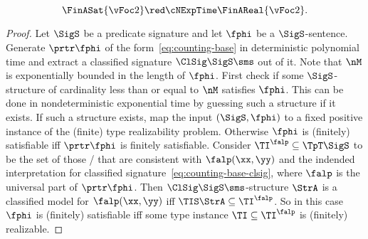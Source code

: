 \begin{remark}
\[
\FinASat{\vFoc2} \red\cNExpTime \FinAReal{\vFoc2}.
\]
\end{remark}
\begin{proof}
Let $\SigS$ be a predicate signature and let $\fphi$ be a $\SigS$-sentence.
Generate $\prtr\fphi$ of the form~\cref{eq:counting-base} in deterministic
polynomial time and extract a classified signature $\ClSig\SigS\sms$ out of it.
Note that $\nM$ is exponentially bounded in the length of $\fphi$.
First check if some $\SigS$-structure of cardinality less than or equal to $\nM$
satisfies $\fphi$. This can be done in nondeterministic exponential time by
guessing such a structure if it exists.
If such a structure exists, map the input $(\SigS,\fphi)$ to a fixed positive
instance of the (finite) type realizability problem.
Otherwise $\fphi$ is (finitely) satisfiable iff $\prtr\fphi$ is finitely
satisfiable.
Consider $\TI^\falp \subseteq \TpT\SigS$ to be the set of those \twotypes/ that
are consistent with $\falp(\xx,\yy)$ and the indended interpretation for
classified signature~\cref{eq:counting-base-clsig}, where $\falp$ is the
universal part of $\prtr\fphi$.
Then $\ClSig\SigS\sms$-structure $\StrA$ is a classified model for
$\falp(\xx,\yy)$ iff $\TIS\StrA \subseteq \TI^\falp$.
So in this case $\fphi$ is (finitely) satisfiable iff some
type instance $\TI\subseteq\TI^\falp$ is (finitely) realizable.
\end{proof}

